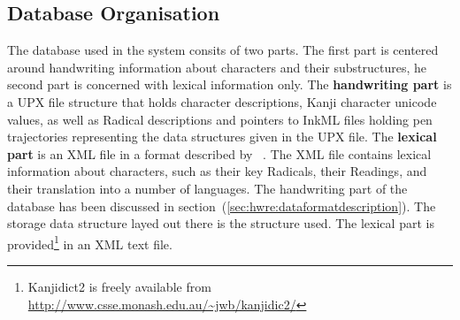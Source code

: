 



\subsection{Database Organisation}
\label{sec:hwre:databaseorganisation}

The database used in the system consits of two parts. The first part is centered
around handwriting information about characters and their substructures, 
he second part is concerned with lexical information only.
The \textbf{handwriting part} is a UPX file structure that holds character 
descriptions, Kanji character unicode values, as well as Radical descriptions 
and pointers to InkML files holding pen trajectories representing the
data structures given in the UPX file.
The \textbf{lexical part} is an XML file in a format described 
by~ \citeyear{Breen2004}. The XML file contains 
lexical information about characters, such as their key Radicals, their Readings,
and their translation into a number of languages.
The handwriting part of the database has been discussed in 
section~(\ref{sec:hwre:dataformatdescription}). The storage data structure layed
out there is the structure used.
The lexical part is provided\footnote{Kanjidict2 is freely available from \url{http://www.csse.monash.edu.au/~jwb/kanjidic2/}} in an XML text file.

